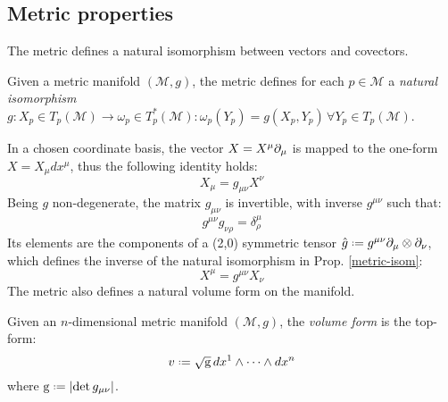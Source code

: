 \subsection{Metric properties}

The metric defines a natural isomorphism between vectors and covectors.

\begin{proposition}\label{metric-isom}
  Given a metric manifold $ (\mathcal{M},g) $, the metric defines for each $ p \in \mathcal{M} $ a \textit{natural isomorphism} $ g : X_p \in T_p (\mathcal{M}) \rightarrow \omega_p \in T^*_p (\mathcal{M}) : \omega_p(Y_p) = g(X_p,Y_p) \,\forall Y_p \in T_p (\mathcal{M}) $.
\end{proposition}

In a chosen coordinate basis, the vector $ X = X^{\mu} \partial_{\mu} $ is mapped to the one-form $ X = X_{\mu} dx^{\mu} $, thus the following identity holds:
\begin{equation}
  X_{\mu} = g_{\mu \nu} X^{\nu}
  \label{eq:3.10}
\end{equation}
Being $ g $ non-degenerate, the matrix $ g_{\mu \nu} $ is invertible, with inverse $ g^{\mu \nu} $ such that:
\begin{equation}
  g^{\mu \nu} g_{\nu \rho} = \delta^{\mu}_{\rho}
  \label{eq:3.11}
\end{equation}
Its elements are the components of a (2,0) symmetric tensor $ \hat{g} \defeq g^{\mu \nu} \pa_{\mu} \otimes \pa_{\nu} $, which defines the inverse of the natural isomorphism in Prop. \ref{metric-isom}:
\begin{equation}
  X^{\mu} = g^{\mu \nu} X_{\nu}
  \label{eq:3.12}
\end{equation}
The metric also defines a natural volume form on the manifold.

\begin{definition}
  Given an $ n $-dimensional metric manifold $ (\mathcal{M},g) $, the \textit{volume form} is the top-form:
  \begin{equation}
    v \defeq \sqg\, dx^1 \wedge \dots \wedge dx^n
    \label{eq:3.13}
  \end{equation}
  where $ \tens{g} \defeq \abs{\det g_{\mu \nu}} $.
\end{definition}

